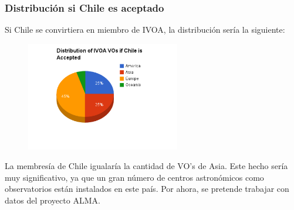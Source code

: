 \newpage

\begin{frame}
\frametitle{Distribución si Chile es aceptado}
Si Chile se convirtiera en miembro de IVOA, la distribución sería la siguiente:
\newline

\begin{multicols}{2}
    \begin{figure}[h!t]
        \begin{center}
            \includegraphics[width=0.6\textwidth]{img/if_chile_is_accepted.png}
        \end{center}
    \end{figure}

La membresía de Chile igualaría la cantidad de VO's de Asia.  Este hecho
sería muy significativo, ya que un gran número de centros astronómicos como
observatorios están instalados en este país. Por ahora, se pretende trabajar
con datos del proyecto ALMA.
\end{multicols}

\end{frame}
